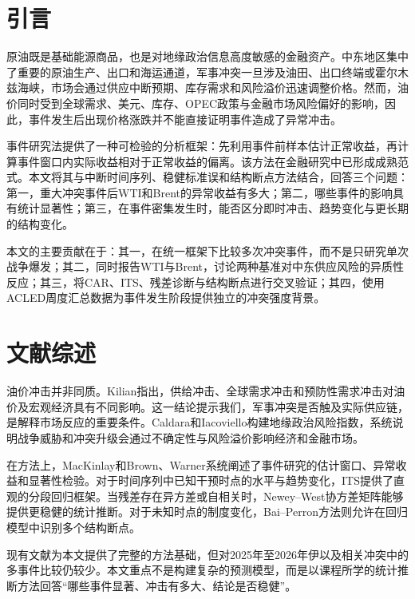 \documentclass[UTF8,zihao=-4,a4paper]{ctexart}
\begin{document}
\newpage
\tableofcontents
\newpage
{}

\section{引言}

原油既是基础能源商品，也是对地缘政治信息高度敏感的金融资产。中东地区集中了重要的原油生产、出口和海运通道，军事冲突一旦涉及油田、出口终端或霍尔木兹海峡，市场会通过供应中断预期、库存需求和风险溢价迅速调整价格。然而，油价同时受到全球需求、美元、库存、OPEC政策与金融市场风险偏好的影响，因此，事件发生后出现价格涨跌并不能直接证明事件造成了异常冲击。

事件研究法提供了一种可检验的分析框架：先利用事件前样本估计正常收益，再计算事件窗口内实际收益相对于正常收益的偏离。该方法在金融研究中已形成成熟范式\cite{mackinlay1997,brownwarner1985}。本文将其与中断时间序列、稳健标准误和结构断点方法结合，回答三个问题：第一，重大冲突事件后WTI和Brent的异常收益有多大；第二，哪些事件的影响具有统计显著性；第三，在事件密集发生时，能否区分即时冲击、趋势变化与更长期的结构变化。

本文的主要贡献在于：其一，在统一框架下比较多次冲突事件，而不是只研究单次战争爆发；其二，同时报告WTI与Brent，讨论两种基准对中东供应风险的异质性反应；其三，将CAR、ITS、残差诊断与结构断点进行交叉验证；其四，使用ACLED周度汇总数据为事件发生阶段提供独立的冲突强度背景。

\section{文献综述}

油价冲击并非同质。Kilian\cite{kilian2009}指出，供给冲击、全球需求冲击和预防性需求冲击对油价及宏观经济具有不同影响。这一结论提示我们，军事冲突是否触及实际供应链，是解释市场反应的重要条件。Caldara和Iacoviello\cite{caldara2022}构建地缘政治风险指数，系统说明战争威胁和冲突升级会通过不确定性与风险溢价影响经济和金融市场。

在方法上，MacKinlay\cite{mackinlay1997}和Brown、Warner\cite{brownwarner1985}系统阐述了事件研究的估计窗口、异常收益和显著性检验。对于时间序列中已知干预时点的水平与趋势变化，ITS提供了直观的分段回归框架\cite{bernal2017}。当残差存在异方差或自相关时，Newey--West协方差矩阵能够提供更稳健的统计推断\cite{neweywest1987}。对于未知时点的制度变化，Bai--Perron方法则允许在回归模型中识别多个结构断点\cite{bai1998,bai2003}。

现有文献为本文提供了完整的方法基础，但对2025年至2026年伊以及相关冲突中的多事件比较仍较少。本文重点不是构建复杂的预测模型，而是以课程所学的统计推断方法回答“哪些事件显著、冲击有多大、结论是否稳健”。
\end{document}
